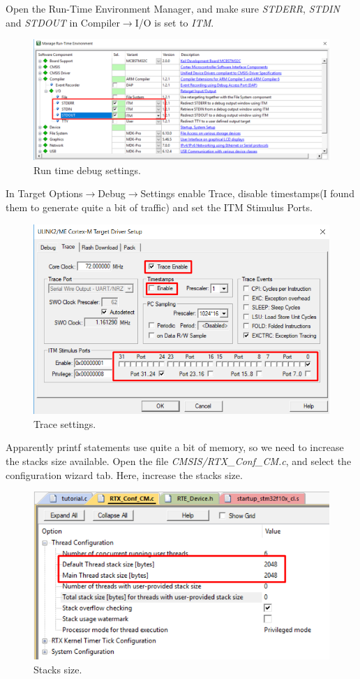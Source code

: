 \documentclass{article}
\begin{document}
Open the Run-Time Environment Manager, and make sure \textit{STDERR}, \textit{STDIN}
and \textit{STDOUT} in Compiler$\to$I/O is set to \textit{ITM}.
\begin{figure}[h!]
    \centering
    \includegraphics[width=0.8\linewidth]{pics/RuntimeDebug.png}
    \caption{Run time debug settings.}
    \label{fig:Run time debug settings}
\end{figure}

\newpage

In Target Options$\to$Debug$\to$Settings enable Trace, disable timestamps(I found them to generate quite a bit of traffic)
and set the ITM Stimulus Ports.
\begin{figure}[H]
    \centering
    \includegraphics[width=0.8\linewidth]{pics/TraceSetup.png}
    \caption{Trace settings.}
    \label{fig:TraceSettings}
\end{figure}

Apparently printf statements use quite a bit of memory, so we need to increase the stacks size available.
Open the file \textit{CMSIS/RTX\_Conf\_CM.c}, and select the configuration wizard tab.
Here, increase the stacks size.
\begin{figure}[H]
    \centering
    \includegraphics[width=0.8\linewidth]{pics/ThreadStackSize.png}
    \caption{Stacks size.}
    \label{fig:StackSize}
\end{figure}
\end{document}
